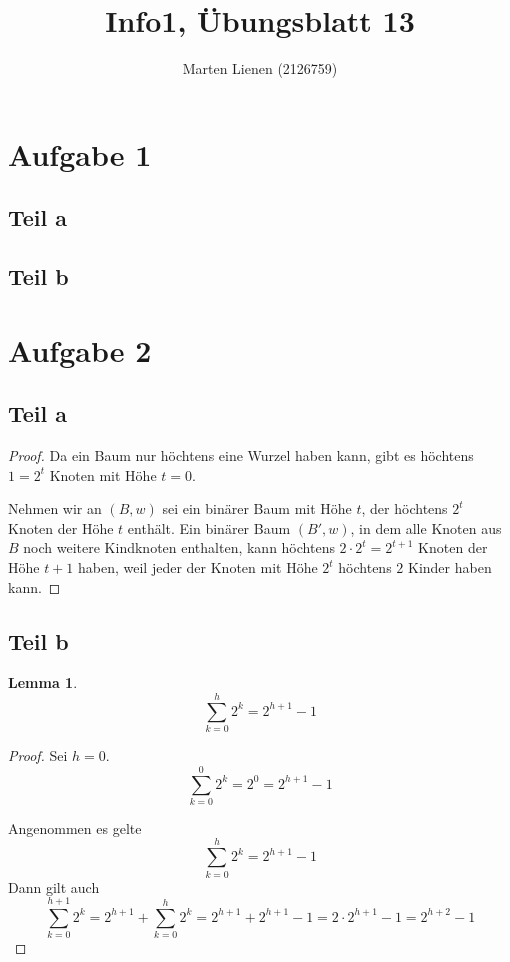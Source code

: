 \documentclass[a4paper,10pt]{article}
\title{Info1, Übungsblatt 13}
\author{Marten Lienen (2126759)}
\newtheorem{lemma*}{Lemma}
\begin{document}
\maketitle

\section*{Aufgabe 1}

\subsection*{Teil a}

\subsection*{Teil b}

\section*{Aufgabe 2}

\subsection*{Teil a}

\begin{proof}
 Da ein Baum nur höchtens eine Wurzel haben kann, gibt es höchtens $1 = 2^t$ Knoten mit Höhe $t = 0$.
 
 Nehmen wir an $(B, w)$ sei ein binärer Baum mit Höhe $t$, der höchtens $2^t$ Knoten der Höhe $t$ enthält.
 Ein binärer Baum $(B', w)$, in dem alle Knoten aus $B$ noch weitere Kindknoten enthalten, kann höchtens $2 \cdot 2^t = 2^{t + 1}$ Knoten der Höhe $t + 1$ haben, weil jeder der Knoten mit Höhe $2^t$ höchtens $2$ Kinder haben kann.
\end{proof}

\subsection*{Teil b}

\begin{lemma*}
 \begin{equation}
  \sum_{k = 0}^h 2^k = 2^{h + 1} - 1
 \end{equation}
\end{lemma*}

\begin{proof}
 Sei $h = 0$.
 \begin{equation}
  \sum_{k = 0}^0 2^k = 2^0 = 2^{h + 1} - 1
 \end{equation}
 
 Angenommen es gelte
 \begin{equation}
  \sum_{k = 0}^h 2^k = 2^{h + 1} - 1
 \end{equation}
 Dann gilt auch
 \begin{equation}
  \sum_{k = 0}^{h + 1} 2^k = 2^{h + 1} + \sum_{k = 0}^h 2^k = 2^{h + 1} + 2^{h + 1} - 1 = 2 \cdot 2^{h + 1} - 1 = 2^{h + 2} - 1
 \end{equation}
\end{proof}
\end{document}
